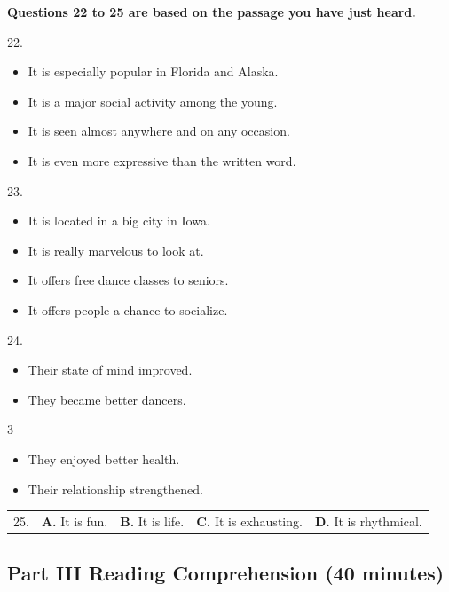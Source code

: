 \documentclass[UTF8,11pt]{ctexart}
\begin{document}
\textbf{Questions 22 to 25 are based on the passage you have just heard.}


22.


\begin{itemize}[leftmargin=2em,itemsep=.2em,topsep=.4em]\item[A.] It is especially popular in Florida and Alaska.
\item[B.] It is a major social activity among the young.
\item[C.] It is seen almost anywhere and on any occasion.
\item[D.] It is even more expressive than the written word.
\end{itemize}

23.


\begin{itemize}[leftmargin=2em,itemsep=.2em,topsep=.4em]\item[A.] It is located in a big city in Iowa.
\item[B.] It is really marvelous to look at.
\item[C.] It offers free dance classes to seniors.
\item[D.] It offers people a chance to socialize.
\end{itemize}

24.


\begin{itemize}[leftmargin=2em,itemsep=.2em,topsep=.4em]\item[A.] Their state of mind improved.
\item[B.] They became better dancers.
\end{itemize}

3


\begin{itemize}[leftmargin=2em,itemsep=.2em,topsep=.4em]\item[C.] They enjoyed better health.
\item[D.] Their relationship strengthened.
\end{itemize}

\noindent\begin{tabularx}{\linewidth}{@{}lXXXX@{}}25. & \textbf{A.} It is fun. & \textbf{B.} It is life. & \textbf{C.} It is exhausting. & \textbf{D.} It is rhythmical.\\\end{tabularx}\par

\subsection*{\textbf{Part} III \textbf{Reading Comprehension} \textbf{(40 minutes)}}
\end{document}
